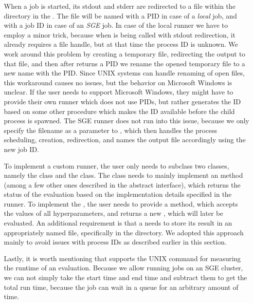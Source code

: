 When a job is started, its stdout and stderr are redirected to a file within the  directory in the . The file will be named with a PID in case of a \emph{local} job, and with a job ID in case of an \emph{SGE} job. In case of the local runner we have to employ a minor trick, because when  is being called with stdout redirection, it already requires a file handle, but at that time the process ID is unknown. We work around this problem by creating a temporary file, redirecting the output to that file, and then after  returns a PID we rename the opened temporary file to a new name with the PID. Since UNIX systems can handle renaming of open files, this workaround causes no issues, but the behavior on Microsoft Windows is unclear. If the user needs to support Microsoft Windows, they might have to provide their own runner which does not use PIDs, but rather generates the ID based on some other procedure which makes the ID available before the child process is spawned. The SGE runner does not run into this issue, because we only specify the filename as a parameter to , which then handles the process scheduling, creation, redirection, and names the output file accordingly using the new job ID.

To implement a custom runner, the user only needs to subclass two classes, namely the  class and the  class. The  class needs to mainly implement an  method (among a few other ones described in the abstract interface), which returns the status of the evaluation based on the implementation details specified in the runner. To implement the , the user needs to provide a  method, which accepts the values of all hyperparameters, and returns a new , which will later be evaluated. An additional requirement is that a  needs to store its result in an appropriately named file, specifically  in the  directory. We adopted this approach mainly to avoid issues with process IDs as described earlier in this section.

Lastly, it is worth mentioning that \bopt supports the UNIX  command for measuring the runtime of an evaluation. Because we allow running jobs on an SGE cluster, we can not simply take the start time and end time and subtract them to get the total run time, because the job can wait in a queue for an arbitrary amount of time.

